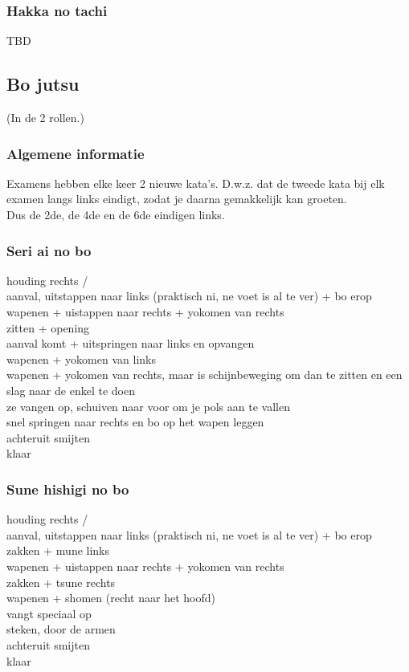\subsubsection{Hakka no tachi}

TBD

\subsection{Bo jutsu}
(In de 2 rollen.)

\subsubsection{Algemene informatie}

Examens hebben elke keer 2 nieuwe kata's. D.w.z. dat de tweede kata bij elk examen langs links eindigt, zodat je daarna gemakkelijk kan groeten.\\
Dus de 2de, de 4de en de 6de eindigen links.

\subsubsection{Seri ai no bo}

houding rechts /\\
aanval, uitstappen naar links (praktisch ni, ne voet is al te ver) + bo erop\\
wapenen + uistappen naar rechts + yokomen van rechts\\
zitten + opening\\
aanval komt + uitspringen naar links en opvangen\\
wapenen + yokomen van links\\
wapenen + yokomen van rechts, maar is schijnbeweging om dan te zitten en een slag naar de enkel te doen\\
ze vangen op, schuiven naar voor om je pols aan te vallen\\
snel springen naar rechts en bo op het wapen leggen\\
achteruit smijten\\
klaar

\subsubsection{Sune hishigi no bo}

houding rechts /\\
aanval, uitstappen naar links (praktisch ni, ne voet is al te ver) + bo erop\\
zakken + mune links\\
wapenen + uistappen naar rechts + yokomen van rechts\\
zakken + tsune rechts\\
wapenen + shomen (recht naar het hoofd)\\
vangt speciaal op\\
steken, door de armen\\
achteruit smijten\\
klaar

